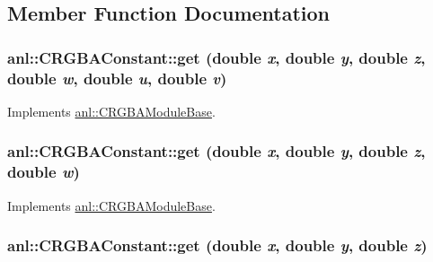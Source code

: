 \subsection{Member Function Documentation}
\hypertarget{classanl_1_1CRGBAConstant_ae1d83d837656a78bc42106768d911b83}{
\subsubsection[{get}]{ anl::CRGBAConstant::get (double {\em x}, \/  double {\em y}, \/  double {\em z}, \/  double {\em w}, \/  double {\em u}, \/  double {\em v})}}
\label{classanl_1_1CRGBAConstant_ae1d83d837656a78bc42106768d911b83}


Implements \hyperlink{classanl_1_1CRGBAModuleBase_aa5a0b719101302596a697aa8c2292f55}{anl::CRGBAModuleBase}.\hypertarget{classanl_1_1CRGBAConstant_a198233c5bec1e23e0b786cb340bd3a75}{
\subsubsection[{get}]{ anl::CRGBAConstant::get (double {\em x}, \/  double {\em y}, \/  double {\em z}, \/  double {\em w})}}
\label{classanl_1_1CRGBAConstant_a198233c5bec1e23e0b786cb340bd3a75}


Implements \hyperlink{classanl_1_1CRGBAModuleBase_ab94523074ef298bb99f0830051e78c1c}{anl::CRGBAModuleBase}.\hypertarget{classanl_1_1CRGBAConstant_aba1cf079bf221502fe759880358b2370}{
\subsubsection[{get}]{ anl::CRGBAConstant::get (double {\em x}, \/  double {\em y}, \/  double {\em z})}}
\label{classanl_1_1CRGBAConstant_aba1cf079bf221502fe759880358b2370}



